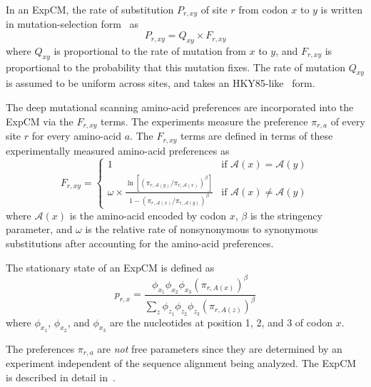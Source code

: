 \documentclass[11pt]{article}
\begin{document}
In an ExpCM, the rate of substitution $P_{r,xy}$ of site $r$ from codon $x$ to $y$ is written in mutation-selection form~\citep{halpern1998evolutionary,mccandlish2014modeling,spielman2015relationship} as
\begin{equation}
\label{eq:ExpCM}
P_{r,xy} = Q_{xy} \times F_{r,xy}
\end{equation}
where $Q_{xy}$ is proportional to the rate of mutation from $x$ to $y$, and $F_{r,xy}$ is proportional to the probability that this mutation fixes.
The rate of mutation $Q_{xy}$ is assumed to be uniform across sites, and takes an HKY85-like~\citep{hasegawa1985dating} form.

The deep mutational scanning amino-acid preferences are incorporated into the ExpCM via the $F_{r,xy}$ terms.
The experiments measure the preference $\pi_{r,a}$ of every site $r$ for every amino-acid $a$.
The $F_{r,xy}$ terms are defined in terms of these experimentally measured amino-acid preferences as
\begin{equation}
\label{eq:Frxy}
F_{r,xy} = 
\begin{cases}
   1 & \mbox{if $\mathcal{A}\left(x\right) = \mathcal{A}\left(y\right)$} \\
   \omega \times \frac{\ln\left[\left(\pi_{r,\mathcal{A}\left(y\right)} / \pi_{r,\mathcal{A}\left(x\right)}\right)^{\beta}\right]}{1 - \left(\pi_{r,\mathcal{A}\left(x\right)} / \pi_{r,\mathcal{A}\left(y\right)}\right)^{\beta}} & \mbox{if $\mathcal{A}\left(x\right) \ne \mathcal{A}\left(y\right)$}
   \end{cases}
\end{equation}
where $\mathcal{A}\left(x\right)$ is the amino-acid encoded by codon $x$, $\beta$ is the stringency parameter, and $\omega$ is the relative rate of nonsynonymous to synonymous substitutions after accounting for the amino-acid preferences.

The stationary state of an ExpCM is defined as 
\begin{equation}
\label{eq:prx}
p_{r,x} = \frac{\phi_{x_1}\phi_{x_2}\phi_{x_3}\left(\pi_{r,A\left(x\right)}\right)^\beta}{\sum_z \phi_{z_1}\phi_{z_2}\phi_{z_3}\left(\pi_{r,A\left(z\right)}\right)^\beta}
\end{equation}
where $\phi_{x_1}$, $\phi_{x_2}$, and $\phi_{x_3}$ are the nucleotides at position 1, 2, and 3 of codon $x$. 

The preferences $\pi_{r,a}$ are \emph{not} free parameters since they are determined by an experiment independent of the sequence alignment being analyzed.
The ExpCM is described in detail in~\citet{hilton2017phydms}. 
\end{document}
